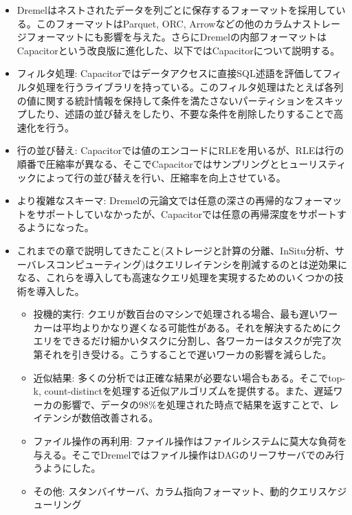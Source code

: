 \documentclass[dvipdfmx,uplatex]{jsarticle}
\theoremstyle{remark}
\newenvironment{method}[1]{
    \begin{tcolorbox}[
        colframe=green!50!black,
        colback=green!50!black!10!white,
        colbacktitle=green!50!black!40!white,
        coltitle=black,
        fonttitle=\bfseries,
        title={#1}
    ]
}{
    \end{tcolorbox}
}
\begin{document}
\begin{method}{ネストされたデータのカラムナストレージ}
\begin{itemize}
    \item Dremelはネストされたデータを列ごとに保存するフォーマットを採用している。このフォーマットはParquet, ORC, Arrowなどの他のカラムナストレージフォーマットにも影響を与えた。さらにDremelの内部フォーマットはCapacitorという改良版に進化した、以下ではCapacitorについて説明する。
    \item フィルタ処理: Capacitorではデータアクセスに直接SQL述語を評価してフィルタ処理を行うライブラリを持っている。このフィルタ処理はたとえば各列の値に関する統計情報を保持して条件を満たさないパーティションをスキップしたり、述語の並び替えをしたり、不要な条件を削除したりすることで高速化を行う。
    \item 行の並び替え: Capacitorでは値のエンコードにRLEを用いるが、RLEは行の順番で圧縮率が異なる、そこでCapacitorではサンプリングとヒューリスティックによって行の並び替えを行い、圧縮率を向上させている。
    \item より複雑なスキーマ: Dremelの元論文では任意の深さの再帰的なフォーマットをサポートしていなかったが、Capacitorでは任意の再帰深度をサポートするようになった。
\end{itemize}
\end{method}

\begin{method}{ビッグデータにおけるクエリレイテンシ}
\begin{itemize}
    \item これまでの章で説明してきたこと(ストレージと計算の分離、InSitu分析、サーバレスコンピューティング)はクエリレイテンシを削減するのとは逆効果になる、これらを導入しても高速なクエリ処理を実現するためのいくつかの技術を導入した。
    \begin{itemize}
        \item 投機的実行: クエリが数百台のマシンで処理される場合、最も遅いワーカーは平均よりかなり遅くなる可能性がある。それを解決するためにクエリをできるだけ細かいタスクに分割し、各ワーカーはタスクが完了次第それを引き受ける。こうすることで遅いワーカの影響を減らした。
        \item 近似結果: 多くの分析では正確な結果が必要ない場合もある。そこでtop-k, count-distinctを処理する近似アルゴリズムを提供する。また、遅延ワーカの影響で、データの98\%を処理された時点で結果を返すことで、レイテンシが数倍改善される。
        \item ファイル操作の再利用: ファイル操作はファイルシステムに莫大な負荷を与える。そこでDremelではファイル操作はDAGのリーフサーバでのみ行うようにした。
        \item その他: スタンバイサーバ、カラム指向フォーマット、動的クエリスケジューリング
    \end{itemize}
\end{itemize}
\end{method}
\end{document}
